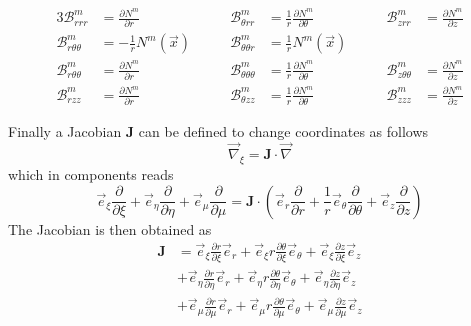\documentclass[times,namecite]{goose-article}
\begin{document}
\begin{alignat}{3}
  \mathcal{B}^{m}_{r      r      r     } &=             \frac{\partial N^m}{\partial r}      & \qquad
  \mathcal{B}^{m}_{\theta r      r     } &= \frac{1}{r} \frac{\partial N^m}{\partial \theta} & \qquad
  \mathcal{B}^{m}_{z      r      r     } &=             \frac{\partial N^m}{\partial z}
  \nonumber
  \\
  \mathcal{B}^{m}_{r      \theta \theta} &= - \frac{1}{r} N^m (\vec{x})  & \qquad
  \mathcal{B}^{m}_{\theta \theta r     } &=   \frac{1}{r} N^m (\vec{x})  & \qquad
  \nonumber
  \\
  \mathcal{B}^{m}_{r      \theta \theta} &=             \frac{\partial N^m}{\partial r}       & \qquad
  \mathcal{B}^{m}_{\theta \theta \theta} &= \frac{1}{r} \frac{\partial N^m}{\partial \theta}  & \qquad
  \mathcal{B}^{m}_{z      \theta \theta} &=             \frac{\partial N^m}{\partial z}
  \\
  \mathcal{B}^{m}_{r      z      z     } &=             \frac{\partial N^m}{\partial r}       & \qquad
  \mathcal{B}^{m}_{\theta z      z     } &= \frac{1}{r} \frac{\partial N^m}{\partial \theta}  & \qquad
  \mathcal{B}^{m}_{z      z      z     } &=             \frac{\partial N^m}{\partial z}
\end{alignat}

Finally a Jacobian $\bm{J}$ can be defined to change coordinates as follows
\begin{equation}
  \vec{\nabla}_\xi = \bm{J} \cdot \vec{\nabla}
\end{equation}
which in components reads
\begin{equation}
  \vec{e}_\xi  \frac{\partial}{\partial \xi }  +
  \vec{e}_\eta \frac{\partial}{\partial \eta} +
  \vec{e}_\mu  \frac{\partial}{\partial \mu}
  =
  \bm{J} \cdot
  \left(
              \vec{e}_r      \frac{\partial}{\partial r     } +
  \frac{1}{r} \vec{e}_\theta \frac{\partial}{\partial \theta} +
              \vec{e}_z      \frac{\partial}{\partial z     }
  \right)
\end{equation}
The Jacobian is then obtained as
\begin{align}
  \bm{J}
  &=
  \vec{e}_\xi    \frac{\partial r     }{\partial \xi } \vec{e}_r      +
  \vec{e}_\xi  r \frac{\partial \theta}{\partial \xi } \vec{e}_\theta +
  \vec{e}_\xi    \frac{\partial z     }{\partial \xi } \vec{e}_z
  \nonumber
  \\
  &+
  \vec{e}_\eta   \frac{\partial r     }{\partial \eta} \vec{e}_r      +
  \vec{e}_\eta r \frac{\partial \theta}{\partial \eta} \vec{e}_\theta +
  \vec{e}_\eta   \frac{\partial z     }{\partial \eta} \vec{e}_z
  \nonumber
  \\
  &+
  \vec{e}_\mu    \frac{\partial r     }{\partial \mu } \vec{e}_r      +
  \vec{e}_\mu  r \frac{\partial \theta}{\partial \mu } \vec{e}_\theta +
  \vec{e}_\mu    \frac{\partial z     }{\partial \mu } \vec{e}_z
\end{align}


% 
\end{document}
